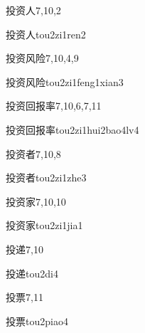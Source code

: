 \begin{entry}{投资人}{7,10,2}
  \begin{phonetics}{投资人}{tou2zi1ren2}
  \end{phonetics}
\end{entry}

\begin{entry}{投资风险}{7,10,4,9}
  \begin{phonetics}{投资风险}{tou2zi1feng1xian3}
  \end{phonetics}
\end{entry}

\begin{entry}{投资回报率}{7,10,6,7,11}
  \begin{phonetics}{投资回报率}{tou2zi1hui2bao4lv4}
  \end{phonetics}
\end{entry}

\begin{entry}{投资者}{7,10,8}
  \begin{phonetics}{投资者}{tou2zi1zhe3}
  \end{phonetics}
\end{entry}

\begin{entry}{投资家}{7,10,10}
  \begin{phonetics}{投资家}{tou2zi1jia1}
  \end{phonetics}
\end{entry}

\begin{entry}{投递}{7,10}
  \begin{phonetics}{投递}{tou2di4}
  \end{phonetics}
\end{entry}

\begin{entry}{投票}{7,11}
  \begin{phonetics}{投票}{tou2piao4}
  \end{phonetics}
\end{entry}

